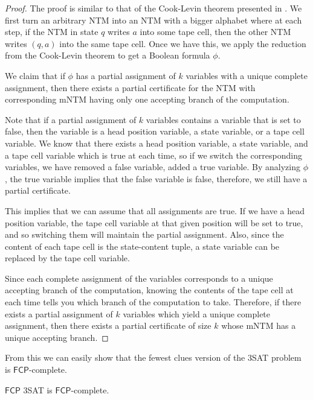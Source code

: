 \documentclass[runningheads,a4paper]{llncs}
\begin{document}
\begin{proof}
The proof is similar to that of the Cook-Levin theorem presented in \cite{Garey}. We first turn an arbitrary NTM into an NTM with a bigger alphabet where at each step, if the NTM in state $q$ writes $a$ into some tape cell, then the other NTM writes $(q,a)$ into the same tape cell. Once we have this, we apply the reduction from the Cook-Levin theorem to get a Boolean formula $\phi$. 

We claim that if $\phi$ has a partial assignment of $k$ variables with a unique complete assignment, then there exists a partial certificate for the NTM with corresponding mNTM having only one accepting branch of the computation.

Note that if a partial assignment of $k$ variables contains a variable that is set to false, then the variable is a head position variable, a state variable, or a tape cell variable. We know that there exists a head position variable, a state variable, and a tape cell variable which is true at each time, so if we switch the corresponding variables, we have removed a false variable, added a true variable. By analyzing $\phi$, the true variable implies that the false variable is false, therefore, we still have a partial certificate. 

This implies that we can assume that all assignments are true. If we have a head position variable, the tape cell variable at that given position will be set to true, and so switching them will maintain the partial assignment. Also, since the content of each tape cell is the state-content tuple, a state variable can be replaced by the tape cell variable.

Since each complete assignment of the variables corresponds to a unique accepting branch of the computation, knowing the contents of the tape cell at each time tells you which branch of the computation to take. Therefore, if there exists a partial assignment of $k$ variables which yield a unique complete assignment, then there exists a partial certificate of size $k$ whose mNTM has a unique accepting branch.
\end{proof}

From this we can easily show that the fewest clues version of the 3SAT problem is $\mathsf{FCP}$-complete.

\begin{theorem}
$\mathsf{FCP}$ 3SAT is $\mathsf{FCP}$-complete.
\end{theorem}
\end{document}
